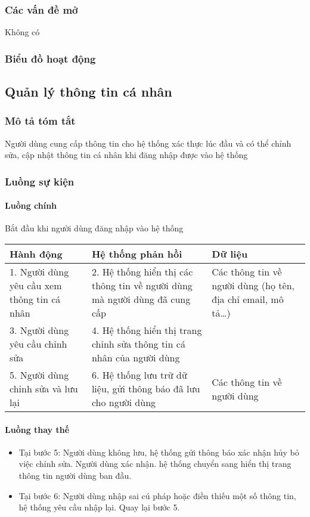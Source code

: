 \documentclass[./../main_file.tex]{subfiles}
\begin{document}
	\subsubsection{Các vấn đề mở}
	Không có
	
	\subsubsection{Biểu đồ hoạt động}

\subsection{Quản lý thông tin cá nhân}
\subsubsection{Mô tả tóm tắt}
Người dùng cung cấp thông tin cho hệ thống xác thực lúc đầu và có thể chỉnh sửa, cập nhật thông tin cá nhân khi đăng nhập được vào hệ thống
\subsubsection{Luồng sự kiện}
\paragraph{Luồng chính}
Bắt đầu khi người dùng đăng nhập vào hệ thống
\begin{longtable}{|p{}|p{}|p{}|}
		\hline
		\textbf{Hành động}                 & \textbf{Hệ thống phản hồi}                                            & \textbf{Dữ liệu}            \\ \hline
		1. Người dùng yêu cầu xem thông tin cá nhân &
		2. Hệ thống hiển thị các thông tin về người dùng mà người dùng đã cung cấp &
		Các thông tin về người dùng (họ tên, địa chỉ email, mô tả…) \\ \hline
		3. Người dùng yêu cầu chỉnh sửa    & 4. Hệ thống hiển thị trang chỉnh sửa thông tin cá nhân của người dùng &                             \\ \hline
		5. Người dùng chỉnh sửa và lưu lại & 6. Hệ thống lưu trữ dữ liệu, gửi thông báo đã lưu cho người dùng      & Các thông tin về người dùng \\ \hline
\end{longtable}
\paragraph{Luồng thay thế}
\begin{itemize}
	\item Tại bước 5: Người dùng không lưu, hệ thống gửi thông báo xác nhận hủy bỏ việc chỉnh sửa. Người dùng xác nhận. hệ thống chuyển sang hiển thị trang thông tin người dùng ban đầu.
	\item Tại bước 6: Người dùng nhập sai cú pháp hoặc điền thiếu một số thông tin, hệ thống yêu cầu nhập lại. Quay lại bước 5.
	
\end{itemize}
\end{document}
